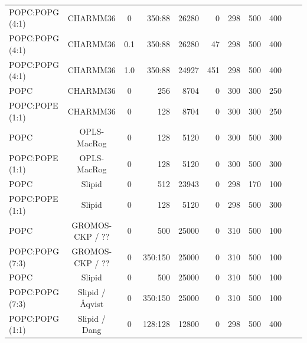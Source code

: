 \documentclass[journal=jpcbfk]{achemso}
\begin{document}
\begin{table}[htb]
\begin{minipage}[t]{\textwidth}
{\begin{tabular}{l c c r r r r r r c c}
      POPC:POPG (4:1)        & CHARMM36 \cite{klauda10,venable13}    & 0  & 350:88 & 26280 & 0  &  298  & 500 & 400 & \cite{CHARMM36POPCPOPG4010} \\
      POPC:POPG (4:1)        & CHARMM36 \cite{klauda10,venable13}    & 0.1 & 350:88 & 26280 & 47  &  298  & 500 & 400 & \cite{CHARMM36POPCPOPG4010100mMCaCl} \\
      POPC:POPG (4:1)        & CHARMM36 \cite{klauda10,venable13}    & 1.0 & 350:88 & 24927 & 451  &  298  & 500 & 400 & \cite{CHARMM36POPCPOPG40101000mMCaCl} \\
      \hline
      POPC             & CHARMM36 \cite{klauda10}        &0          & 256 & 8704 & 0  &  300  & 300 & 250 & \cite{POPCcharmm300K} \\
      POPC:POPE (1:1)  & CHARMM36 \cite{klauda10,venable13}         & 0  & 128 & 8704 & 0  &  300  & 300 & 250 & \cite{POPC1POPE1charmm36} \\
      \hline
      POPC             & OPLS-MacRog \cite{rog16}     &0           & 128 & 5120 & 0  &  300  & 500 & 300 & \cite{POPCmacrog300K} \\
      POPC:POPE (1:1)  & OPLS-MacRog \cite{rog16}     &0           & 128 & 5120 & 0  &  300  & 500 & 300 & \cite{POPC1POPE1macrogT300K} \\
      \hline
      POPC             & Slipid \cite{jambeck12b}     &0          & 512 & 23943 & 0  &  298  & 170 & 100 & \cite{POPCslipid298K} \\
      POPC:POPE (1:1)  & Slipid \cite{jambeck12b}     &0          & 128 & 5120  & 0  &  298  & 500 & 300 & \cite{POPC1POPE1slipidT298K} \\
     \hline
      POPC                   & GROMOS-CKP / ?? \cite{??,??}  & 0  & 500     & 25000 & 0   &  310  & 500 & 100 & \cite{POPCgromosCKPT310K}  \\
      POPC:POPG (7:3)        & GROMOS-CKP / ?? \cite{??,??}  & 0  & 350:150 & 25000 & 0   &  310  & 500 & 100 & \cite{POPC7POPG3gromosCKPT310K} \\
     \hline
      POPC                   & Slipid \cite{jambeck12b}  & 0      & 500     & 25000 & 0   &  310  & 500 & 100 & \cite{POPCslipid301K}  \\
      POPC:POPG (7:3)        & Slipid / {\AA}qvist \cite{jambeck12b,aqvist90} & 0  & 350:150 & 25000 & 0   &  310  & 500 & 100 & \cite{slipidPOPC70POPG30T310K} \\
      POPC:POPG (1:1)        & Slipid / Dang \cite{jambeck12b,jambeck2012another,smith94,dang06} & 0  & 128:128 & 12800 & 0   &  298  & 500 & 400 & \cite{slipidPOPC50POPG50T298K} \\

\end{tabular}}
\end{minipage}
\end{table}
\end{document}
